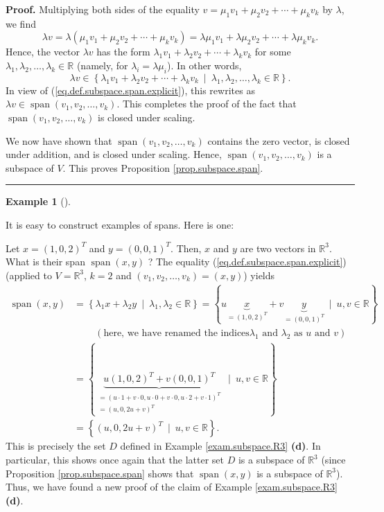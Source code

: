 \documentclass[numbers=enddot,12pt,final,onecolumn,notitlepage]{scrartcl}%
\theoremstyle{definition}
\newtheorem{exam}[theo]{Example}
\newenvironment{example}[1][]
{\begin{exam}[#1]\begin{leftbar}}
{\end{leftbar}\end{exam}}
\newenvironment{proof}[1][Proof]{\noindent\textbf{#1.} }{\ \rule{0.5em}{0.5em}}
\begin{document}
\begin{proof}
Multiplying both sides of the equality $v=\mu_{1}v_{1}+\mu_{2}v_{2}+\cdots
+\mu_{k}v_{k}$ by $\lambda$, we find%
\[
\lambda v=\lambda\left(  \mu_{1}v_{1}+\mu_{2}v_{2}+\cdots+\mu_{k}v_{k}\right)
=\lambda\mu_{1}v_{1}+\lambda\mu_{2}v_{2}+\cdots+\lambda\mu_{k}v_{k}.
\]
Hence, the vector $\lambda v$ has the form $\lambda_{1}v_{1}+\lambda_{2}%
v_{2}+\cdots+\lambda_{k}v_{k}$ for some $\lambda_{1},\lambda_{2}%
,\ldots,\lambda_{k}\in\mathbb{R}$ (namely, for $\lambda_{i}=\lambda\mu_{i}$).
In other words,
\[
\lambda v\in\left\{  \lambda_{1}v_{1}+\lambda_{2}v_{2}+\cdots+\lambda_{k}%
v_{k}\ \mid\ \lambda_{1},\lambda_{2},\ldots,\lambda_{k}\in\mathbb{R}\right\}
.
\]
In view of (\ref{eq.def.subspace.span.explicit}), this rewrites as $\lambda
v\in\operatorname{span}\left(  v_{1},v_{2},\ldots,v_{k}\right)  $. This
completes the proof of the fact that $\operatorname{span}\left(  v_{1}%
,v_{2},\ldots,v_{k}\right)  $ is closed under scaling.

We now have shown that $\operatorname{span}\left(  v_{1},v_{2},\ldots
,v_{k}\right)  $ contains the zero vector, is closed under addition, and is
closed under scaling. Hence, $\operatorname{span}\left(  v_{1},v_{2}%
,\ldots,v_{k}\right)  $ is a subspace of $V$. This proves Proposition
\ref{prop.subspace.span}.
\end{proof}

\begin{example}
It is easy to construct examples of spans. Here is one:

Let $x=\left(  1,0,2\right)  ^{T}$ and $y=\left(  0,0,1\right)  ^{T}$. Then,
$x$ and $y$ are two vectors in $\mathbb{R}^{3}$. What is their span
$\operatorname{span}\left(  x,y\right)  $ ? The equality
(\ref{eq.def.subspace.span.explicit}) (applied to $V=\mathbb{R}^{3}$, $k=2$
and $\left(  v_{1},v_{2},\ldots,v_{k}\right)  =\left(  x,y\right)  $) yields%
\begin{align*}
\operatorname{span}\left(  x,y\right)   &  =\left\{  \lambda_{1}x+\lambda
_{2}y\ \mid\ \lambda_{1},\lambda_{2}\in\mathbb{R}\right\}  =\left\{
u\underbrace{x}_{=\left(  1,0,2\right)  ^{T}}+v\underbrace{y}_{=\left(
0,0,1\right)  ^{T}}\ \mid\ u,v\in\mathbb{R}\right\} \\
&  \ \ \ \ \ \ \ \ \ \ \left(  \text{here, we have renamed the indices
}\lambda_{1}\text{ and }\lambda_{2}\text{ as }u\text{ and }v\right) \\
&  =\left\{  \underbrace{u\left(  1,0,2\right)  ^{T}+v\left(  0,0,1\right)
^{T}}_{\substack{=\left(  u\cdot1+v\cdot0,u\cdot0+v\cdot0,u\cdot
2+v\cdot1\right)  ^{T}\\=\left(  u,0,2u+v\right)  ^{T}}}\ \mid\ u,v\in
\mathbb{R}\right\} \\
&  =\left\{  \left(  u,0,2u+v\right)  ^{T}\ \mid\ u,v\in\mathbb{R}\right\}  .
\end{align*}
This is precisely the set $D$ defined in Example \ref{exam.subspace.R3}
\textbf{(d)}. In particular, this shows once again that the latter set $D$ is
a subspace of $\mathbb{R}^{3}$ (since Proposition \ref{prop.subspace.span}
shows that $\operatorname{span}\left(  x,y\right)  $ is a subspace of
$\mathbb{R}^{3}$). Thus, we have found a new proof of the claim of Example
\ref{exam.subspace.R3} \textbf{(d)}.
\end{example}
\end{document}
